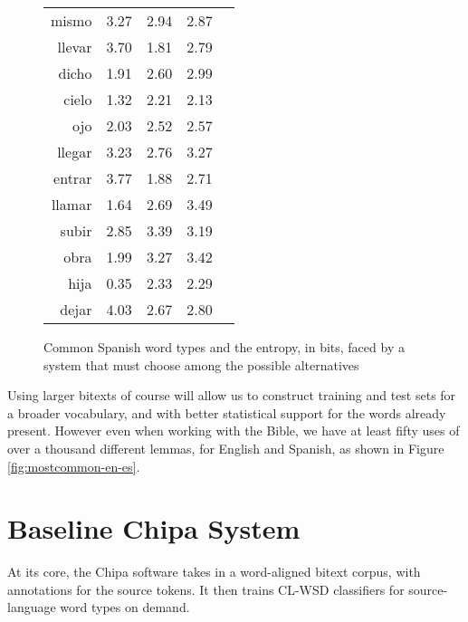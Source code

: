 \begin{figure*}
\begin{tiny}
\begin{centering}
\begin{tabular}{|r|c|c|c|c|}
mismo  &     3.27         &      2.94        &       2.87       \\
llevar &     3.70         &      1.81        &       2.79       \\
dicho  &     1.91         &      2.60        &       2.99       \\
cielo  &     1.32         &      2.21        &       2.13       \\
ojo    &     2.03         &      2.52        &       2.57       \\
llegar &     3.23         &      2.76        &       3.27       \\
entrar &     3.77         &      1.88        &       2.71       \\
llamar &     1.64         &      2.69        &       3.49       \\
subir  &     2.85         &      3.39        &       3.19       \\
obra   &     1.99         &      3.27        &       3.42       \\
hija   &     0.35         &      2.33        &       2.29       \\
dejar  &     4.03         &      2.67        &       2.80       \\
    \hline
  \end{tabular}
  \end{centering}
  \end{tiny}
  \caption{Common Spanish word types and the entropy, in bits, faced by a
  system that must choose among the possible alternatives} 
  \label{fig:mostcommon-es-entropy}
\end{figure*}


Using larger bitexts of course will allow us to construct training and test
sets for a broader vocabulary, and with better statistical support for the
words already present. However even when working with the Bible, we
have at least fifty uses of over a thousand different lemmas, for English and
Spanish, as shown in Figure \ref{fig:mostcommon-en-es}.


\section{Baseline Chipa System}
At its core, the Chipa software takes in a word-aligned bitext corpus, with
annotations for the source tokens. It then trains CL-WSD classifiers for
source-language word types on demand. 

